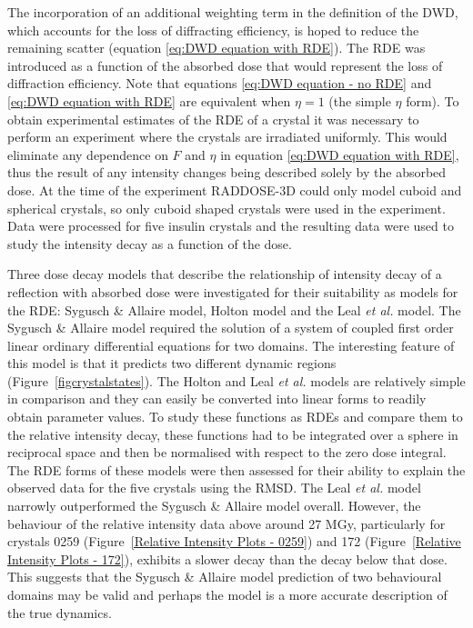 The incorporation of an additional weighting term in the definition of the DWD, which accounts for the loss of diffracting efficiency, is hoped to reduce the remaining scatter (equation \ref{eq:DWD equation with RDE}).
The RDE was introduced as a function of the absorbed dose that would represent the loss of diffraction efficiency.
Note that equations \ref{eq:DWD equation - no RDE} and \ref{eq:DWD equation with RDE} are equivalent when $\eta = 1$ (the simple $\eta$ form).
To obtain experimental estimates of the RDE of a crystal it was necessary to perform an experiment where the crystals are irradiated uniformly.
This would eliminate any dependence on $F$ and $\eta$ in equation \ref{eq:DWD equation with RDE}, thus the result of any intensity changes being described solely by the absorbed dose.
At the time of the experiment RADDOSE-3D could only model cuboid and spherical crystals, so only cuboid shaped crystals were used in the experiment.
Data were processed for five insulin crystals and the resulting data were used to study the intensity decay as a function of the dose.

Three dose decay models that describe the relationship of intensity decay of a reflection with absorbed dose were investigated for their suitability as models for the RDE: Sygusch \& Allaire model, Holton model and the Leal \textit{et al.} model.
The Sygusch \& Allaire model required the solution of a system of coupled first order linear ordinary differential equations for two domains.
The interesting feature of this model is that it predicts two different dynamic regions (Figure~\ref{figcrystalstates}).
The Holton and Leal \textit{et al.} models are relatively simple in comparison and they can easily be converted into linear forms to readily obtain parameter values.
To study these functions as RDEs and compare them to the relative intensity decay, these functions had to be integrated over a sphere in reciprocal space and then be normalised with respect to the zero dose integral.
The RDE forms of these models were then assessed for their ability to explain the observed data for the five crystals using the RMSD.
The Leal \textit{et al.} model narrowly outperformed the Sygusch \& Allaire model overall.
However, the behaviour of the relative intensity data above around 27 MGy, particularly for crystals 0259 (Figure~\ref{Relative Intensity Plots - 0259}) and 172 (Figure~\ref{Relative Intensity Plots - 172}), exhibits a slower decay than the decay below that dose.
This suggests that the Sygusch \& Allaire model prediction of two behavioural domains may be valid and perhaps the model is a more accurate description of the true dynamics.


